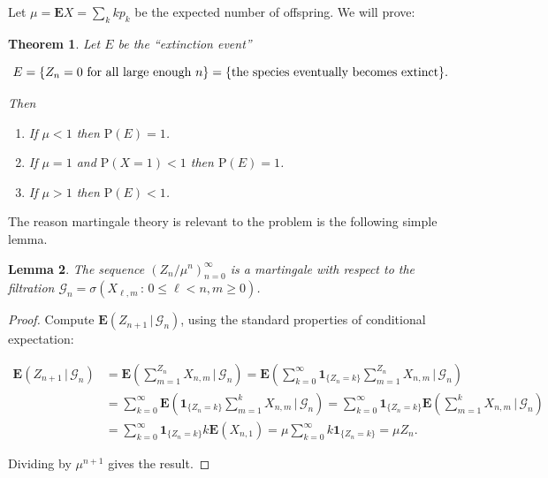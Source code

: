 \documentclass[11pt]{report}
\theoremstyle{plain}
\newtheorem{thm}{Theorem}[chapter]
\newtheorem{lem}[thm]{Lemma}
\theoremstyle{definition}
\begin{document}
Let $\mu=\mathbf{E} X = \sum_k k p_k$ be the expected
number of offspring. We will prove:

\begin{thm}
\label{thm-galton-watson}
Let $E$ be the ``extinction event''

\[
E = \{ Z_n=0 \textnormal{ for all large enough }n\} = \{ \textnormal{the species eventually becomes extinct} \}.
\]

\noindent Then

\begin{enumerate}[label=\arabic*.]
\item If $\mu< 1$ then $\mathrm{P}(E) = 1$.

\item If $\mu=1$ and $\mathrm{P}(X=1)<1$ then
$\mathrm{P}(E)=1$.

\item If $\mu>1$ then $\mathrm{P}(E)<1$.
\end{enumerate}

\end{thm}

\noindent The reason martingale theory is relevant to the
problem is the following simple lemma.

\begin{lem}
The sequence $(Z_n/\mu^n)_{n=0}^\infty$ is a
martingale with respect to the filtration
$\mathcal{G}_n = \sigma(X_{\ell,m}\,:\, 0\le \ell< n,
m\ge 0)$.
\end{lem}

\begin{proof}
Compute
$\mathbf{E}\left(Z_{n+1}\,|\,\mathcal{G}_n\right)$,
using the standard properties of conditional
expectation:

\begin{align*}
\mathbf{E}\left(Z_{n+1}\,|\,\mathcal{G}_n\right) &= \mathbf{E}\left(\sum_{m=1}^{Z_{n}} X_{n,m}\,|\,\mathcal{G}_n\right)
=
\mathbf{E}\left( \sum_{k=0}^\infty  \mathbf{1}_{\{Z_n=k\}} \sum_{m=1}^{Z_{n}} X_{n,m}\,|\,\mathcal{G}_n\right)
\\
&= \sum_{k=0}^\infty
\mathbf{E}\left( \mathbf{1}_{\{Z_n=k\}} \sum_{m=1}^{k} X_{n,m}\,|\,\mathcal{G}_n\right)
= \sum_{k=0}^\infty \mathbf{1}_{\{Z_n=k\}}
\mathbf{E}\left(  \sum_{m=1}^{k} X_{n,m}\,|\,\mathcal{G}_n\right) \\
&=
\sum_{k=0}^\infty \mathbf{1}_{\{Z_n=k\}} k \mathbf{E}(X_{n,1}) = \mu \sum_{k=0}^\infty k \mathbf{1}_{\{Z_n=k\}} = \mu Z_n.
\end{align*}

\noindent Dividing by $\mu^{n+1}$ gives the result.
\end{proof}
\end{document}
